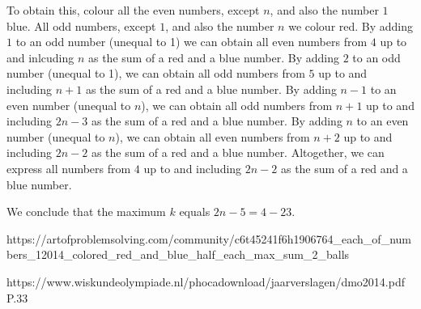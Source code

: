 \begin{shortque*}{}
{        To obtain this, colour all the even numbers, except $n$, and also the number $1$ blue. All odd numbers, except $1$, and also the number $n$ we colour red.  By adding $1$ to an odd number (unequal to 1) we can obtain all even numbers from $4$ up to and inlcuding $n$ as the sum of a red and a blue number. By adding $2$ to an odd number (unequal to 1), we can obtain all odd numbers from $5$ up to and including $n+1$ as the sum of a red and a blue number. By adding $n-1$ to an even number (unequal to $n$), we can obtain all odd numbers from $n + 1$ up to and including $2n-3$ as the sum of a red and a blue number. By adding $n$ to an even number (unequal to $n$), we can obtain all even numbers from $n + 2$ up to and including $2n-2$ as the sum of a red and a blue number. Altogether, we can express all
        numbers from $4$ up to and including $2n-2$ as the sum of a red and a blue number.

        We conclude that the maximum $k$ equals $2n-5=4-23$.
        }{%
        https://artofproblemsolving.com/community/c6t45241f6h1906764_each_of_numbers_12014_colored_red_and_blue_half_each_max_sum_2_balls

        https://www.wiskundeolympiade.nl/phocadownload/jaarverslagen/dmo2014.pdf
        P.33
    }

\end{shortque*}
